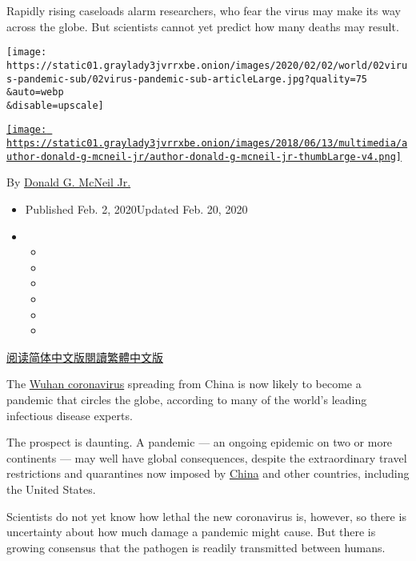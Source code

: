 Rapidly rising caseloads alarm researchers, who fear the virus may make
its way across the globe. But scientists cannot yet predict how many
deaths may result.

\texttt{[image: https://static01.graylady3jvrrxbe.onion/images/2020/02/02/world/02virus-pandemic-sub/02virus-pandemic-sub-articleLarge.jpg?quality=75\\\&auto=webp\\\&disable=upscale]}

\href{https://www.nytimes3xbfgragh.onion/by/donald-g-mcneil-jr}{\texttt{[image: https://static01.graylady3jvrrxbe.onion/images/2018/06/13/multimedia/author-donald-g-mcneil-jr/author-donald-g-mcneil-jr-thumbLarge-v4.png]}}

By
\href{https://www.nytimes3xbfgragh.onion/by/donald-g-mcneil-jr}{Donald
G. McNeil Jr.}

\begin{itemize}
\item
  Published Feb. 2, 2020Updated Feb. 20, 2020
\item
  \begin{itemize}
  \item
  \item
  \item
  \item
  \item
  \item
  \end{itemize}
\end{itemize}

\href{https://cn.nytimes3xbfgragh.onion/china/20200203/coronavirus-pandemic-china/}{阅读简体中文版}\href{https://cn.nytimes3xbfgragh.onion/china/20200203/coronavirus-pandemic-china/zh-hant/}{閱讀繁體中文版}

The
\href{https://www.nytimes3xbfgragh.onion/2020/02/20/world/asia/japan-coronavirus-clusters.html}{Wuhan
coronavirus} spreading from China is now likely to become a pandemic
that circles the globe, according to many of the world's leading
infectious disease experts.

The prospect is daunting. A pandemic --- an ongoing epidemic on two or
more continents --- may well have global consequences, despite the
extraordinary travel restrictions and quarantines now imposed by
\href{https://www.nytimes3xbfgragh.onion/2020/02/20/world/asia/japan-coronavirus-clusters.html}{China}
and other countries, including the United States.

Scientists do not yet know how lethal the new coronavirus is, however,
so there is uncertainty about how much damage a pandemic might cause.
But there is growing consensus that the pathogen is readily transmitted
between humans.

